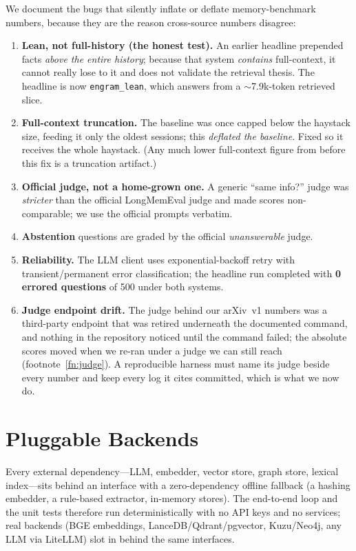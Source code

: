 \documentclass{article}
\newcommand{\lean}{\texttt{engram\_lean}}
\begin{document}
We document the bugs that silently inflate or deflate memory-benchmark numbers, because they are the reason
cross-source numbers disagree:
\begin{enumerate}
  \item \textbf{Lean, not full-history (the honest test).} An earlier headline prepended facts \emph{above the
  entire history}; because that system \emph{contains} full-context, it cannot really lose to it and does not
  validate the retrieval thesis. The headline is now \lean{}, which answers from a $\sim$7.9k-token retrieved
  slice.
  \item \textbf{Full-context truncation.} The baseline was once capped below the haystack size, feeding it
  only the oldest sessions; this \emph{deflated the baseline}. Fixed so it receives the whole haystack. (Any
  much lower full-context figure from before this fix is a truncation artifact.)
  \item \textbf{Official judge, not a home-grown one.} A generic ``same info?'' judge was \emph{stricter} than
  the official LongMemEval judge and made scores non-comparable; we use the official prompts verbatim.
  \item \textbf{Abstention} questions are graded by the official \emph{unanswerable} judge.
  \item \textbf{Reliability.} The LLM client uses exponential-backoff retry with transient/permanent error
  classification; the headline run completed with \textbf{0 errored questions} of 500 under both systems.
  \item \textbf{Judge endpoint drift.} The judge behind our arXiv~v1 numbers was a third-party endpoint that
  was retired underneath the documented command, and nothing in the repository noticed until the command
  failed; the absolute scores moved when we re-ran under a judge we can still reach
  (footnote~\ref{fn:judge}). A reproducible harness must name its judge beside every number and keep every
  log it cites committed, which is what we now do.
\end{enumerate}

\section{Pluggable Backends}
\label{app:backends}

Every external dependency---LLM, embedder, vector store, graph store, lexical index---sits behind an interface
with a zero-dependency offline fallback (a hashing embedder, a rule-based extractor, in-memory stores). The
end-to-end loop and the unit tests therefore run deterministically with no API keys and no services; real
backends (BGE embeddings, LanceDB/Qdrant/pgvector, Kuzu/Neo4j, any LLM via LiteLLM) slot in behind the same
interfaces.
\end{document}
